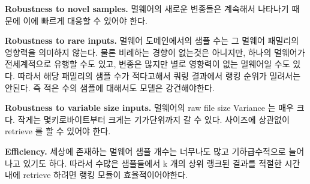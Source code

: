 \textbf{Robustness to novel samples. }
멀웨어의 새로운 변종들은 계속해서 나타나기 때문에 이에 빠르게 대응할 수 있어야 한다. 

\textbf{Robustness to rare inputs. }
멀웨어 도메인에서의 샘플 수는 그 멀웨어 패밀리의 영향력을 의미하지 않는다. 물론 비례하는 경향이 없는것은 아니지만, 하나의 멀웨어가 전세계적으로 유행할 수도 있고, 변종은 많지만 별로 영향력이 없는 멀웨어일 수도 있다. 따라서 해당 패밀리의 샘플 수가 적다고해서 쿼링 결과에서 랭킹 순위가 밀려서는 안된다. 즉 적은 수의 샘플에 대해서도 모델은 강건해야한다. 

\textbf{Robustness to variable size inputs. }
멀웨어의 raw file size Variance 는 매우 크다. 작게는 몇키로바이트부터 크게는 기가단위까지 갈 수 있다. 사이즈에 상관없이 retrieve 를 할 수 있어야 한다.

\textbf{Efficiency. }
세상에 존재하는 멀웨어 샘플 개수는 너무나도 많고 기하급수적으로 늘어나고 있기도 하다. 따라서 수많은 샘플들에서 k 개의 상위 랭크된 결과를 적절한 시간 내에 retrieve 하려면 랭킹 모듈이 효율적이어야한다.



